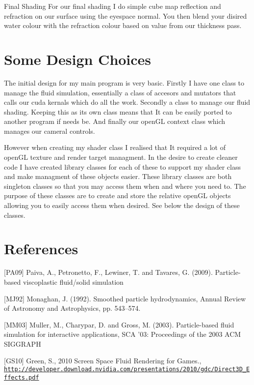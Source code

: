 \begin{DoxyEnumerate}
\item Final Shading For our final shading I do simple cube map reflection and refraction on our surface using the eyespace normal. You then blend your disired water colour with the refraction colour based on value from our thickness pass.\par
    
\end{DoxyEnumerate}

\section*{Some Design Choices }

The initial design for my main program is very basic. Firstly I have one class to manage the fluid simulation, essentially a class of accesors and mutators that calls our cuda kernals which do all the work. Secondly a class to manage our fluid shading. Keeping this as its own class means that It can be easily ported to another program if needs be. And finally our open\-G\-L context class which manages our cameral controls.\par
 However when creating my shader class I realised that It required a lot of open\-G\-L texture and render target managment. In the desire to create cleaner code I have created library classes for each of these to support my shader class and make managment of these objects easier. These library classes are both singleton classes so that you may access them when and where you need to. The purpose of these classes are to create and store the relative open\-G\-L objects allowing you to easily access them when desired. See below the design of these classes.\par


\section*{References }

\mbox{[}P\-A09\mbox{]} Paiva, A., Petronetto, F., Lewiner, T. and Tavares, G. (2009). Particle-\/based viscoplastic fluid/solid simulation\par
\mbox{[}M\-J92\mbox{]} Monaghan, J. (1992). Smoothed particle hydrodynamics, Annual Review of Astronomy and Astrophysics, pp. 543–574.\par
\mbox{[}M\-M03\mbox{]} Muller, M., Charypar, D. and Gross, M. (2003). Particle-\/based fluid simulation for interactive applications, S\-C\-A ’03\-: Proceedings of the 2003 A\-C\-M S\-I\-G\-G\-R\-A\-P\-H\par
\mbox{[}G\-S10\mbox{]} Green, S., 2010 Screen Space Fluid Rendering for Games., \href{http://developer.download.nvidia.com/presentations/2010/gdc/Direct3D_Effects.pdf}{\tt http\-://developer.\-download.\-nvidia.\-com/presentations/2010/gdc/\-Direct3\-D\-\_\-\-Effects.\-pdf}\par
